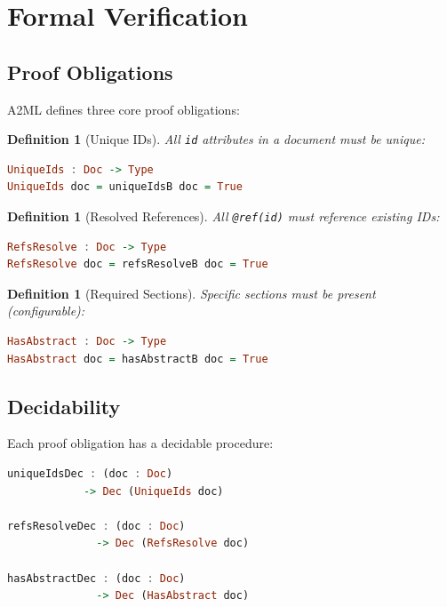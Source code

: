 \documentclass[10pt,twocolumn]{article}
\newtheorem{definition}[theorem]{Definition}
\begin{document}
\section{Formal Verification}
\label{sec:verification}

\subsection{Proof Obligations}

A2ML defines three core proof obligations:

\begin{definition}[Unique IDs]
All \texttt{id} attributes in a document must be unique:
\begin{lstlisting}[language=Haskell]
UniqueIds : Doc -> Type
UniqueIds doc = uniqueIdsB doc = True
\end{lstlisting}
\end{definition}

\begin{definition}[Resolved References]
All \texttt{@ref(id)} must reference existing IDs:
\begin{lstlisting}[language=Haskell]
RefsResolve : Doc -> Type
RefsResolve doc = refsResolveB doc = True
\end{lstlisting}
\end{definition}

\begin{definition}[Required Sections]
Specific sections must be present (configurable):
\begin{lstlisting}[language=Haskell]
HasAbstract : Doc -> Type
HasAbstract doc = hasAbstractB doc = True
\end{lstlisting}
\end{definition}

\subsection{Decidability}

Each proof obligation has a decidable procedure:

\begin{lstlisting}[language=Haskell]
uniqueIdsDec : (doc : Doc)
            -> Dec (UniqueIds doc)

refsResolveDec : (doc : Doc)
              -> Dec (RefsResolve doc)

hasAbstractDec : (doc : Doc)
              -> Dec (HasAbstract doc)
\end{lstlisting}
\end{document}
